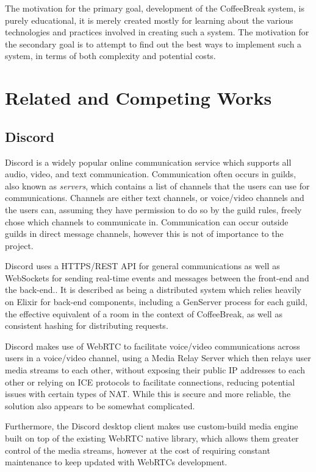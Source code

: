 The motivation for the primary goal, development of the CoffeeBreak system, is purely educational, it is merely created mostly for learning about the various technologies and practices involved in creating such a system. The motivation for the secondary goal is to attempt to find out the best ways to implement such a system, in terms of both complexity and potential costs.

\section{Related and Competing Works}

\subsection{Discord}

Discord is a widely popular online communication service which supports all audio, video, and text communication. Communication often occurs in guilds\cite{discorddocsguild}, also known as \textit{servers}, which contains a list of channels that the users can use for communications. Channels are either text channels, or voice/video channels and the users can, assuming they have permission to do so by the guild rules, freely chose which channels to communicate in. Communication can occur outside guilds in direct message channels, however this is not of importance to the project.\cite{discordwebrtc}

Discord uses a HTTPS/REST API for general communications as well as WebSockets for sending real-time events and messages between the front-end and the back-end.\cite{discordapireference}. It is described as being a distributed system which relies heavily on Elixir for back-end components, including a GenServer process for each guild, the effective equivalent of a room in the context of CoffeeBreak, as well as consistent hashing for distributing requests.\cite{discordscaling}

Discord makes use of WebRTC\cite{webrtc} to facilitate voice/video communications across users in a voice/video channel, using a Media Relay Server which then relays user media streams to each other, without exposing their public IP addresses to each other or relying on ICE\cite{webrtcprotocols} protocols to facilitate connections, reducing potential issues with certain types of NAT. While this is secure and more reliable, the solution also appears to be somewhat complicated.\cite{discordwebrtc}

Furthermore, the Discord desktop client makes use custom-build media engine built on top of the existing WebRTC native library, which allows them greater control of the media streams, however at the cost of requiring constant maintenance to keep updated with WebRTCs development.\cite{discordwebrtc}

